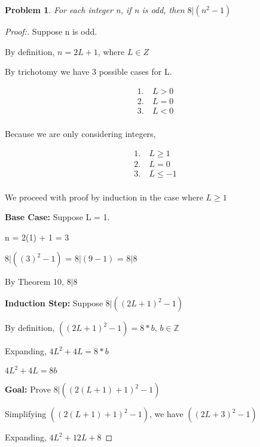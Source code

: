 \documentclass[12pt]{article}
\newtheorem{theorem}{Problem}[section]
\begin{document}
\newpage

\begin{theorem}
    For each integer n, if n is odd, then $8 | (n^2 - 1)$
\end{theorem}

\begin{proof}[Proof:]

    Suppose n is odd.

    By definition, $n = 2L + 1$, where $L \in Z$

    By trichotomy we have 3 possible cases for L.

    \[
        \begin{aligned}
        1. &\ L > 0 \\
        2. &\ L = 0 \\
        3. &\ L < 0 \\
        \end{aligned}
    \]

    Because we are only considering integers,

    \[
        \begin{aligned}
        1. &\ L \geq 1 \\
        2. &\ L = 0 \\
        3. &\ L \leq -1 \\
        \end{aligned}
    \]

    We proceed with proof by induction in the case where $L \geq 1$

    \medskip

    \textbf{Base Case:} Suppose L = 1. 
    
    n = 2(1) + 1 = 3
    
    $8 | ((3)^2 - 1)$ = $8 | (9 - 1)$ = $8 | 8$

    By Theorem 10, $8 | 8$  
    
    \medskip

    \textbf{Induction Step:} Suppose $8 | ((2L+1)^2 - 1)$

    By definition, $((2L + 1)^2 - 1) = 8 * b$, $b \in \mathbb{Z}$

    Expanding, $4L^2 + 4L = 8 * b$

    $4L^2 + 4L = 8b$

    \medskip

    \textbf{Goal:} Prove $8 | ((2(L + 1) + 1)^2 - 1)$

    Simplifying $((2(L + 1) + 1)^2 - 1)$, we have $((2L + 3)^2 - 1)$

    Expanding, $4L^2 + 12L + 8$


\end{proof}
\end{document}
